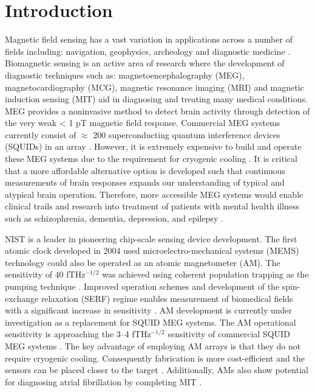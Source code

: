 \section{Introduction}
Magnetic field sensing has a vast variation in applications across a number of fields including: navigation, geophysics, archeology and diagnostic medicine \citep{Budker2007OpticalMagnetometry,Khedr2017AApplications}. Biomagnetic sensing is an active area of research where the development of diagnostic techniques such as: magnetoencephalography (MEG), magnetocardiography (MCG), magnetic resonance imaging (MRI) and magnetic induction sensing (MIT) aid in diagnosing and treating many medical conditions. MEG provides a noninvasive method to detect brain activity through detection of the very weak < 1 pT magnetic field response. Commercial MEG systems currently consist of $\approx$ 200 superconducting quantum interference devices (SQUIDs) in an array \citep{Sander2012MagnetoencephalographyMagnetometer.}. However, it is extremely expensive to build and operate these MEG systems due to the requirement for cryogenic cooling \citep{Knappe2014Optically-PumpedMEG}. It is critical that a more affordable alternative option is developed such that continuous measurements of brain responses expands our understanding of typical and atypical brain operation. Therefore, more accessible MEG systems would enable clinical trails and research into treatment of patients with mental health illness such as schizophrenia, dementia, depression, and epilepsy \citep{Johnson2010MagnetoencephalographyMagnetometer}.

NIST is a leader in pioneering chip-scale sensing device development. The first atomic clock developed in 2004 used microelectro-mechanical systems (MEMS) technology could also be operated as an atomic magnetometer (AM). The sensitivity of 40 fTHz$^{-1/2}$ was achieved using coherent population trapping as the pumping technique \citep{Schwindt2004Chip-scaleMagnetometer}. Improved operation schemes and development of the spin-exchange relaxation (SERF) regime enables measurement of biomedical fields with a significant increase in sensitivity \citep{Allred2002High-SensitivityRelaxation}. AM development is currently under investigation as a replacement for SQUID MEG systems. The AM operational sensitivity is approaching the 3–4 fTHz$^{-1/2}$ sensitivity of commercial SQUID MEG systems \citep{Shah2013AApplications}. The key advantage of employing AM arrays is that they do not require cryogenic cooling. Consequently fabrication is more cost-efficient and the sensors can be placed closer to the target \citep{Boto2017AMagnetometers}.  Additionally, AMs also show potential for diagnosing atrial fibrillation by completing MIT \citep{Deans2016OpticalHeart}.  

